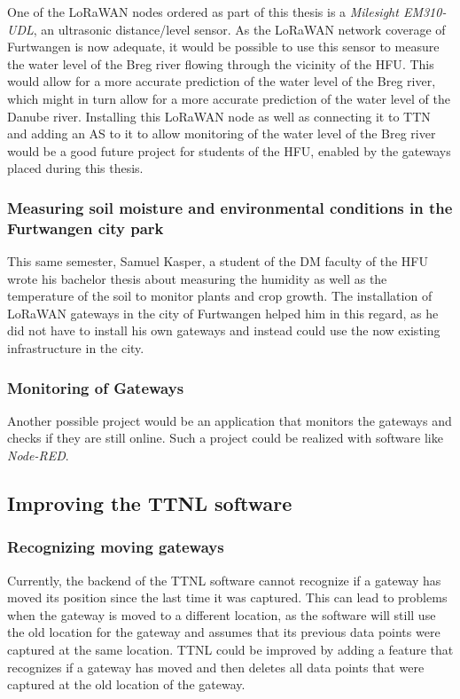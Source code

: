 One of the \ac{LoRaWAN} nodes ordered as part of this thesis is a \emph{Milesight EM310-UDL}, an ultrasonic distance/level sensor.
As the \ac{LoRaWAN} network coverage of Furtwangen is now adequate, it would be possible to use this sensor to measure the water level of the Breg river flowing through the vicinity of the \ac{HFU}.
This would allow for a more accurate prediction of the water level of the Breg river, which might in turn allow for a more accurate prediction of the water level of the Danube river.
Installing this \ac{LoRaWAN} node as well as connecting it to \ac{TTN} and adding an \acf{AS} to it to allow monitoring of the water level of the Breg river would be a good future project for students of the \ac{HFU}, enabled by the gateways placed during this thesis.

\subsubsection{Measuring soil moisture and environmental conditions in the Furtwangen city park}

This same semester, Samuel Kasper, a student of the \ac{DM} faculty of the \ac{HFU} wrote his bachelor thesis about measuring the humidity as well as the temperature of the soil to monitor plants and crop growth.
The installation of \ac{LoRaWAN} gateways in the city of Furtwangen helped him in this regard, as he did not have to install his own gateways and instead could use the now existing infrastructure in the city.

\subsubsection{Monitoring of Gateways}

Another possible project would be an application that monitors the gateways and checks if they are still online.
Such a project could be realized with software like \emph{Node-RED}.

\subsection{Improving the \acf{TTNL} software}

\subsubsection{Recognizing moving gateways}

Currently, the backend of the \ac{TTNL} software cannot recognize if a gateway has moved its position since the last time it was captured.
This can lead to problems when the gateway is moved to a different location, as the software will still use the old location for the gateway and assumes that its previous data
points were captured at the same location.
\ac{TTNL} could be improved by adding a feature that recognizes if a gateway has moved and then deletes all data points that were captured at the old location of the gateway.

